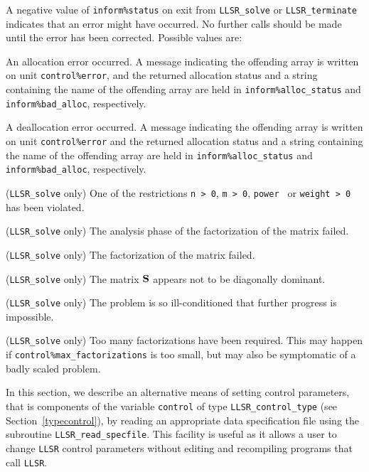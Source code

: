 \documentclass{galahad}
\newcommand{\packagename}{LLSR}
\begin{document}

\galerrors
A negative value of  {\tt inform\%status} on exit from
{\tt \packagename\_solve}
or
{\tt \packagename\_terminate}
indicates that an error might have occurred. No further calls should be made
until the error has been corrected. Possible values are:

\begin{description}
 An allocation error occurred. A message indicating
the offending
array is written on unit {\tt control\%error}, and the returned allocation
status and a string containing the name of the offending array
are held in {\tt inform\%alloc\_\-status}
and {\tt inform\%bad\_alloc}, respectively.

 A deallocation error occurred.
A message indicating the offending
array is written on unit {\tt control\%error} and the returned allocation
status and a string containing the name of the offending array
are held in {\tt inform\%alloc\_\-status}
and {\tt inform\%bad\_alloc}, respectively.

 ({\tt \packagename\_solve} only)
One of the restrictions
{\tt n > 0},
{\tt m > 0},
{\tt power }
or
{\tt weight > 0}
has been violated.

 ({\tt \packagename\_solve} only)
The analysis phase of the factorization of the matrix  failed.

 ({\tt \packagename\_solve} only)
The factorization of the matrix  failed.

 ({\tt \packagename\_solve} only)
The matrix ${\mathbf{S}}$ appears not to be diagonally dominant.

 ({\tt \packagename\_solve} only)
The problem is so ill-conditioned that further progress is impossible.

 ({\tt \packagename\_solve} only)
 Too many factorizations have been required.  This may happen if
    {\tt control\%max\_factorizations} is too small,
    but may also be symptomatic of a badly scaled problem.

\end{description}


\galfeatures
\noindent In this section, we describe an alternative means of setting
control parameters, that is components of the variable {\tt control} of type
{\tt \packagename\_control\_type}
(see Section~\ref{typecontrol}),
by reading an appropriate data specification file using the
subroutine {\tt \packagename\_read\_specfile}. This facility
is useful as it allows a user to change  {\tt \packagename} control parameters
without editing and recompiling programs that call {\tt \packagename}.
\end{document}
